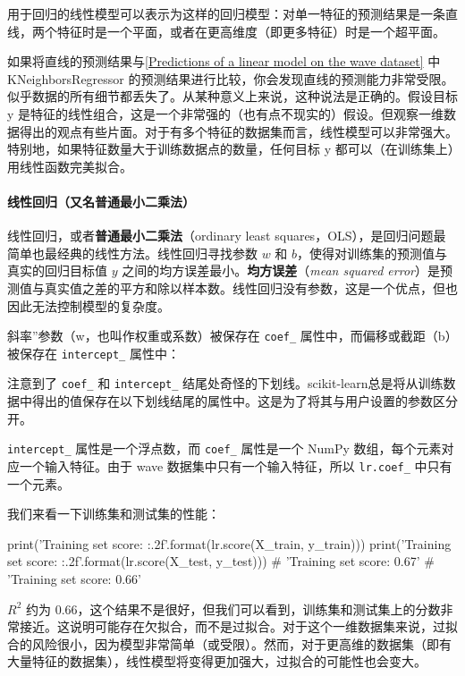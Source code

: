 用于回归的线性模型可以表示为这样的回归模型：对单一特征的预测结果是一条直线，两个特征时是一个平面，或者在更高维度（即更多特征）时是一个超平面。

如果将直线的预测结果与\autoref{Predictions of a linear model on the wave dataset} 中 KNeighborsRegressor 的预测结果进行比较，你会发现直线的预测能力非常受限。似乎数据的所有细节都丢失了。从某种意义上来说，这种说法是正确的。假设目标 y 是特征的线性组合，这是一个非常强的（也有点不现实的）假设。但观察一维数据得出的观点有些片面。对于有多个特征的数据集而言，线性模型可以非常强大。特别地，如果特征数量大于训练数据点的数量，任何目标 y 都可以（在训练集上）用线性函数完美拟合。

\paragraph{线性回归（又名普通最小二乘法）} 线性回归，或者\textbf{普通最小二乘法}（ordinary least squares，OLS），是回归问题最简单也最经典的线性方法。线性回归寻找参数 $w$ 和 $b$，使得对训练集的预测值与真实的回归目标值 $y$ 之间的均方误差最小。\textbf{均方误差}（\emph{mean squared error}）是预测值与真实值之差的平方和除以样本数。线性回归没有参数，这是一个优点，但也因此无法控制模型的复杂度。

斜率”参数（w，也叫作权重或系数）被保存在 \verb|coef_| 属性中，而偏移或截距（b）被保存在 \verb|intercept_| 属性中：

\begin{tcolorbox}
    注意到了 \verb|coef_| 和 \verb|intercept_| 结尾处奇怪的下划线。scikit-learn总是将从训练数据中得出的值保存在以下划线结尾的属性中。这是为了将其与用户设置的参数区分开。
\end{tcolorbox}

\verb|intercept_| 属性是一个浮点数，而 \verb|coef_| 属性是一个 NumPy 数组，每个元素对应一个输入特征。由于 wave 数据集中只有一个输入特征，所以 \verb|lr.coef_| 中只有一个元素。

我们来看一下训练集和测试集的性能：
\begin{pyc}
    print('Training set score: {:.2f}'.format(lr.score(X_train, y_train)))
    print('Training set score: {:.2f}'.format(lr.score(X_test, y_test)))
    # 'Training set score: 0.67'
    # 'Training set score: 0.66'
\end{pyc}
$R^2$ 约为 0.66，这个结果不是很好，但我们可以看到，训练集和测试集上的分数非常接近。这说明可能存在欠拟合，而不是过拟合。对于这个一维数据集来说，过拟合的风险很小，因为模型非常简单（或受限）。然而，对于更高维的数据集（即有大量特征的数据集），线性模型将变得更加强大，过拟合的可能性也会变大。

